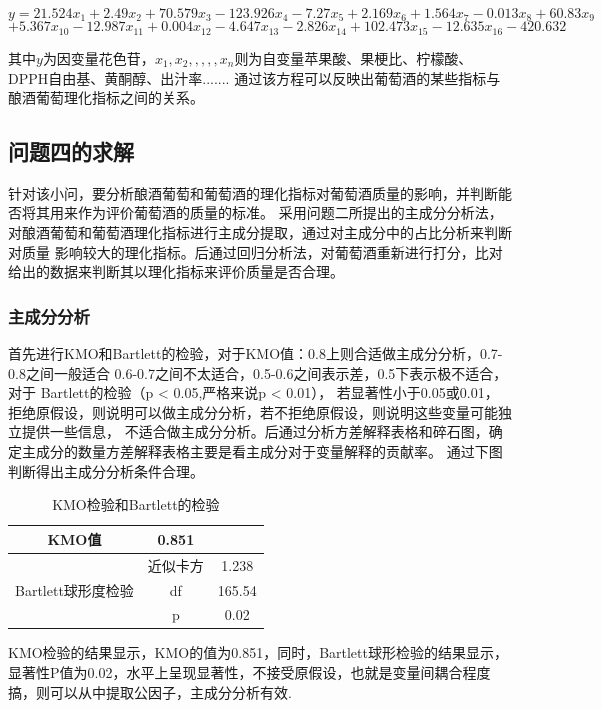 \documentclass[UTF8]{ctexart}
\begin{document}
\begin{equation}
	y=21.524{x_1}+2.49{x_2}+70.579{x_3}-123.926{x_4}-7.27{x_5}+2.169{x_6}+1.564{x_7}-0.013{x_8}+60.83{x_9}
\end{equation}
\begin{equation}
	+5.367{x_{10}}-12.987{x_{11}}+0.004{x_{12}}-4.647{x_{13}}-2.826{x_{14}}+102.473{x_{15}}-12.635{x_{16}}-420.632
\end{equation}

其中$y$为因变量花色苷，${x_1,x_2,,,,,x_n}$则为自变量苹果酸、果梗比、柠檬酸、DPPH自由基、黄酮醇、出汁率.......
通过该方程可以反映出葡萄酒的某些指标与酿酒葡萄理化指标之间的关系。



\subsection{问题四的求解}
针对该小问，要分析酿酒葡萄和葡萄酒的理化指标对葡萄酒质量的影响，并判断能否将其用来作为评价葡萄酒的质量的标准。
采用问题二所提出的主成分分析法，对酿酒葡萄和葡萄酒理化指标进行主成分提取，通过对主成分中的占比分析来判断对质量
影响较大的理化指标。后通过回归分析法，对葡萄酒重新进行打分，比对给出的数据来判断其以理化指标来评价质量是否合理。
\subsubsection{主成分分析}
首先进行KMO和Bartlett的检验，对于KMO值：0.8上则合适做主成分分析，0.7-0.8之间一般适合
0.6-0.7之间不太适合，0.5-0.6之间表示差，0.5下表示极不适合，对于 Bartlett的检验（p < 0.05,严格来说p < 0.01），
若显著性小于0.05或0.01，拒绝原假设，则说明可以做主成分分析，若不拒绝原假设，则说明这些变量可能独立提供一些信息，
不适合做主成分分析。后通过分析方差解释表格和碎石图，确定主成分的数量方差解释表格主要是看主成分对于变量解释的贡献率。
通过下图判断得出主成分分析条件合理。

\begin{table}[h!]
	\begin{center}
		\caption{KMO检验和Bartlett的检验}
		\begin{tabular}{c c c}
			\hline
			KMO值                                                    & 0.851             \\
			\hline
			\multicolumn{1}{c|}{\multirow{3}{*}{Bartlett球形度检验}} & 近似卡方 & 1.238  \\
			\multicolumn{1}{c|}{}                                    & df       & 165.54 \\
			\multicolumn{1}{c|}{}                                    & p        & 0.02   \\
			\hline
		\end{tabular}
	\end{center}
\end{table}
KMO检验的结果显示，KMO的值为0.851，同时，Bartlett球形检验的结果显示，显著性P值为0.02，水平上呈现显著性，不接受原假设，也就是变量间耦合程度搞，则可以从中提取公因子，主成分分析有效.
\end{document}
